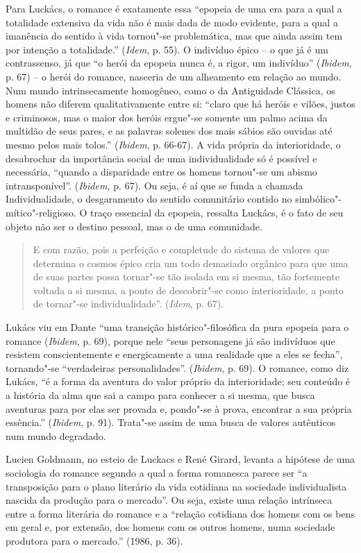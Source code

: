 Para Luckács, o romance é exatamente essa ``epopeia de uma era para a
qual a totalidade extensiva da vida não é mais dada de modo evidente,
para a qual a imanência do sentido à vida tornou"-se problemática, mas
que ainda assim tem por intenção a totalidade.'' (\emph{Idem}, p. 55). O
indivíduo épico -- o que já é um contrassenso, já que ``o herói da
epopeia nunca é, a rigor, um indivíduo'' (\emph{Ibidem}, p. 67) -- o
herói do romance, nasceria de um alheamento em relação ao mundo. Num
mundo intrinsecamente homogêneo, como o da Antiguidade Clássica, os
homens não diferem qualitativamente entre si: ``claro que há heróis e
vilões, justos e criminosos, mas o maior dos heróis ergue"-se somente um
palmo acima da multidão de seus pares, e as palavras solenes dos mais
sábios são ouvidas até mesmo pelos mais tolos.'' (\emph{Ibidem}, p.
66-67). A vida própria da interioridade, o desabrochar da importância
social de uma individualidade só é possível e necessária, ``quando a
disparidade entre os homens tornou"-se um abismo intransponível''.
(\emph{Ibidem,} p. 67). Ou seja, é aí que se funda a chamada
Individualidade, o desgaramento do sentido comunitário contido no
simbólico"-mítico"-religioso. O traço essencial da epopeia, ressalta
Luckács, é o fato de seu objeto não ser o destino pessoal, mas o de uma
comunidade.

\begin{quote}
E com razão, pois a perfeição e completude do sistema de valores que
determina o cosmos épico cria um todo demasiado orgânico para que uma de
suas partes possa tornar"-se tão isolada em si mesma, tão fortemente
voltada a si mesma, a ponto de descobrir"-se como interioridade, a ponto
de tornar"-se individualidade''. (\emph{Idem}, p. 67).
\end{quote}

Lukács viu em Dante ``uma transição histórico"-filosófica da pura epopeia
para o romance (\emph{Ibidem}, p. 69), porque nele ``seus personagens já
são indivíduos que resistem conscientemente e energicamente a uma
realidade que a eles se fecha'', tornando"-se ``verdadeiras
personalidades''. (\emph{Ibidem}, p. 69). O romance, como diz Lukács,
``é a forma da aventura do valor próprio da interioridade; seu conteúdo
é a história da alma que sai a campo para conhecer a si mesma, que busca
aventuras para por elas ser provada e, pondo"-se à prova, encontrar a sua
própria essência.'' (\emph{Ibidem}, p. 91). Trata"-se assim de uma busca
de valores autênticos num mundo degradado.

Lucien Goldmann, no esteio de Luckacs e René Girard, levanta a hipótese
de uma sociologia do romance segundo a qual a forma romanesca parece ser
``a transposição para o plano literário da vida cotidiana na sociedade
individualista nascida da produção para o mercado''. Ou seja, existe uma
relação intrínseca entre a forma literária do romance e a ``relação
cotidiana dos homens com os bens em geral e, por extensão, dos homens
com os outros homens, numa sociedade produtora para o mercado.'' (1986,
p. 36).

